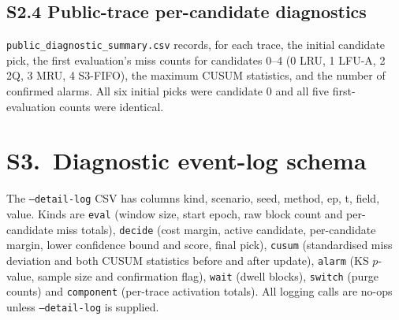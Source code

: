 \documentclass[journal]{IEEEtran}
\begin{document}
\subsection{S2.4 Public-trace per-candidate diagnostics}
\texttt{public\_diagnostic\_summary.csv} records, for each trace, the initial
candidate pick, the first evaluation's miss counts for candidates 0--4
(0 LRU, 1 LFU-A, 2 2Q, 3 MRU, 4 S3-FIFO), the maximum CUSUM statistics, and the
number of confirmed alarms. All six initial picks were candidate 0 and all
five first-evaluation counts were identical.

\section{S3.\ Diagnostic event-log schema}
The \texttt{--detail-log} CSV has columns kind, scenario, seed, method, ep, t,
field, value. Kinds are \texttt{eval} (window size, start epoch, raw block
count and per-candidate miss totals), \texttt{decide} (cost margin, active
candidate, per-candidate margin, lower confidence bound and score, final pick),
\texttt{cusum} (standardised miss deviation and both CUSUM statistics before
and after update), \texttt{alarm} (KS $p$-value, sample size and confirmation
flag), \texttt{wait} (dwell blocks), \texttt{switch} (purge counts) and
\texttt{component} (per-trace activation totals). All logging calls are
no-ops unless \texttt{--detail-log} is supplied.
\end{document}
